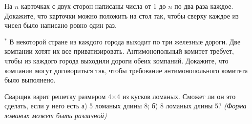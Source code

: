 \begin{thm}
    На $n$ карточках с двух сторон написаны числа от 1 до $n$ по два раза каждое. Докажите, что карточки можно положить на стол так, чтобы сверху каждое из чисел было написано ровно один раз.
\end{thm}

\begin{thm} $^*$
    В некоторой стране из каждого города выходит по три железные дороги. Две компании хотят их все приватизировать. Антимонопольный комитет требует, чтобы из каждого города выходили дороги обеих компаний. Докажите, что компании могут договориться так, чтобы требование антимонопольного комитета было выполнено.
\end{thm}

\begin{thm}
    Сварщик варит решетку размером 4×4 из кусков ломаных. Сможет ли он это сделать, если у него есть а) 5 ломаных длины 8; б) 8 ломаных длины 5? \textit{(Форма ломаных может быть различной)}
\end{thm}